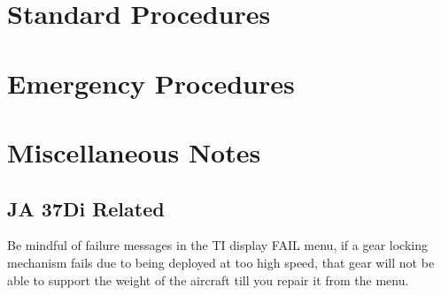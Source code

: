 \documentclass[a4paper]{report}
\begin{document}
\chapter{Standard Procedures}
\chapter{Emergency Procedures}
\chapter{Miscellaneous Notes}
\section{JA 37Di Related}
Be mindful of failure messages in the TI display FAIL menu, if a gear locking mechanism fails due to being deployed at too high speed, that gear will not be able to support the weight of the aircraft till you repair it from the menu.
\end{document}
